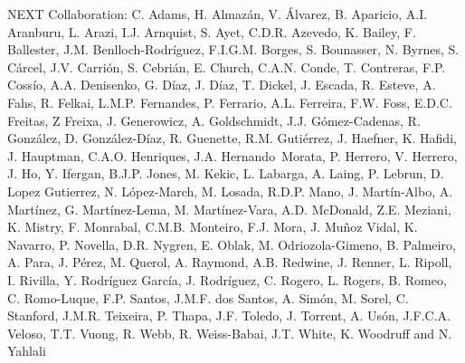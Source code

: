 NEXT Collaboration: C. Adams, H. Almaz\'an, V. \'Alvarez, B. Aparicio, A.I. Aranburu, L. Arazi, I.J. Arnquist, S. Ayet, C.D.R. Azevedo, K. Bailey, F. Ballester, J.M. Benlloch-Rodr\'{i}guez, F.I.G.M. Borges, S. Bounasser, N. Byrnes, S. C\'arcel, J.V. Carri\'on, S. Cebri\'an, E. Church, C.A.N. Conde, T. Contreras, F.P. Coss\'io, A.A. Denisenko, G. D\'iaz, J. D\'iaz, T. Dickel, J. Escada, R. Esteve, A. Fahs, R. Felkai, L.M.P. Fernandes, P. Ferrario, A.L. Ferreira, F.W. Foss, E.D.C. Freitas, Z Freixa, J. Generowicz, A. Goldschmidt, J.J. G\'omez-Cadenas, R. Gonz\'alez, D. Gonz\'alez-D\'iaz, R. Guenette, R.M. Guti\'errez, J. Haefner, K. Hafidi, J. Hauptman, C.A.O. Henriques, J.A. Hernando~Morata, P. Herrero, V. Herrero, J. Ho, Y. Ifergan, B.J.P. Jones, M. Kekic, L. Labarga, A. Laing, P. Lebrun, D. Lopez Gutierrez, N. L\'opez-March, M. Losada, R.D.P. Mano, J. Mart\'in-Albo, A. Mart\'inez, G. Mart\'inez-Lema, M. Mart\'inez-Vara, A.D. McDonald, Z.E. Meziani, K. Mistry, F. Monrabal, C.M.B. Monteiro, F.J. Mora, J. Mu\~noz Vidal, K. Navarro, P. Novella, D.R. Nygren, E. Oblak, M. Odriozola-Gimeno, B. Palmeiro, A. Para, J. P\'erez, M. Querol, A. Raymond, A.B. Redwine, J. Renner, L. Ripoll, I. Rivilla, Y. Rodr\'iguez Garc\'ia, J. Rodr\'iguez, C. Rogero, L. Rogers, B. Romeo, C. Romo-Luque, F.P. Santos, J.M.F. dos Santos, A. Sim\'on, M. Sorel, C. Stanford, J.M.R. Teixeira, P. Thapa, J.F. Toledo, J. Torrent, A. Us\'on, J.F.C.A. Veloso, T.T. Vuong, R. Webb, R. Weiss-Babai, J.T. White, K. Woodruff and N. Yahlali